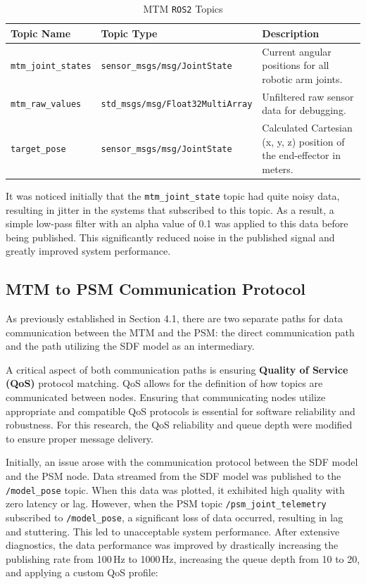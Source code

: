 \begin{table}[H]
    \centering
    \caption{MTM \texttt{ROS2} Topics}
    \label{tab:mtm_ros2_topics}
    \begin{tabular}{|l|l|p{5cm}|} %
        \hline
        \textbf{Topic Name} & \textbf{Topic Type} & \textbf{Description} \\
        \hline
        \texttt{mtm\_joint\_states} & \texttt{sensor\_msgs/msg/JointState} & Current angular positions for all robotic arm joints. \\
        \hline
        \texttt{mtm\_raw\_values} & \texttt{std\_msgs/msg/Float32MultiArray} & Unfiltered raw sensor data for debugging. \\
        \hline
        \texttt{target\_pose} & \texttt{sensor\_msgs/msg/JointState} & Calculated Cartesian (x, y, z) position of the end-effector in meters. \\
        \hline
    \end{tabular}
\end{table}

It was noticed initially that the \texttt{mtm\_joint\_state} topic had quite noisy data, resulting in jitter in the systems that subscribed to this topic. As a result, a simple low-pass filter with an alpha value of 0.1 was applied to this data before being published. This significantly reduced noise in the published signal and greatly improved system performance.

\subsection{MTM to PSM Communication Protocol}

As previously established in Section 4.1, there are two separate paths for data communication between the MTM and the PSM: the direct communication path and the path utilizing the SDF model as an intermediary.

A critical aspect of both communication paths is ensuring \textbf{Quality of Service (QoS)} protocol matching. QoS allows for the definition of how topics are communicated between nodes. Ensuring that communicating nodes utilize appropriate and compatible QoS protocols is essential for software reliability and robustness. For this research, the QoS reliability and queue depth were modified to ensure proper message delivery.

Initially, an issue arose with the communication protocol between the SDF model and the PSM node. Data streamed from the SDF model was published to the \texttt{/model\_pose} topic. When this data was plotted, it exhibited high quality with zero latency or lag. However, when the PSM topic \texttt{/psm\_joint\_telemetry} subscribed to \texttt{/model\_pose}, a significant loss of data occurred, resulting in lag and stuttering. This led to unacceptable system performance. After extensive diagnostics, the data performance was improved by drastically increasing the publishing rate from 100\,Hz to 1000\,Hz, increasing the queue depth from 10 to 20, and applying a custom QoS profile:



